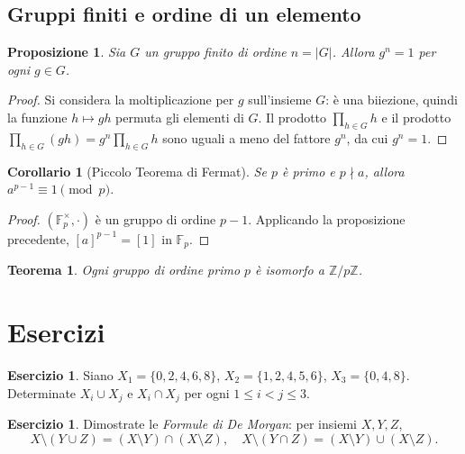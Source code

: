 \documentclass[11pt, a4paper]{book}
\theoremstyle{definition}
\newtheorem{esercizio}[definizione]{Esercizio}
\theoremstyle{plain}
\newtheorem{teorema}[definizione]{Teorema}
\newtheorem{proposizione}[definizione]{Proposizione}
\newtheorem{corollario}[definizione]{Corollario}
\theoremstyle{remark}
\newcommand{\Z}{\mathbb{Z}}
\begin{document}
\subsection{Gruppi finiti e ordine di un elemento}

\begin{proposizione}
Sia $G$ un gruppo finito di ordine $n = |G|$. Allora $g^n = 1$ per ogni $g \in G$.
\end{proposizione}

\begin{proof}
Si considera la moltiplicazione per $g$ sull'insieme $G$: è una biiezione, quindi la funzione $h \mapsto gh$ permuta gli elementi di $G$. Il prodotto $\prod_{h \in G} h$ e il prodotto $\prod_{h \in G} (gh) = g^n \prod_{h \in G} h$ sono uguali a meno del fattore $g^n$, da cui $g^n = 1$.
\end{proof}

\begin{corollario}[Piccolo Teorema di Fermat]
Se $p$ è primo e $p \nmid a$, allora $a^{p-1} \equiv 1 \pmod{p}$.
\end{corollario}

\begin{proof}
$(\mathbb{F}_p^\times, \cdot)$ è un gruppo di ordine $p - 1$. Applicando la proposizione precedente, $[a]^{p-1} = [1]$ in $\mathbb{F}_p$.
\end{proof}

\begin{teorema}
Ogni gruppo di ordine primo $p$ è isomorfo a $\Z/p\Z$.
\end{teorema}

\section*{Esercizi}

\begin{esercizio}
Siano $X_1 = \{0,2,4,6,8\}$, $X_2 = \{1,2,4,5,6\}$, $X_3 = \{0,4,8\}$. Determinate $X_i \cup X_j$ e $X_i \cap X_j$ per ogni $1 \leq i < j \leq 3$.
\end{esercizio}

\begin{esercizio}
Dimostrate le \emph{Formule di De Morgan}: per insiemi $X, Y, Z$,
\[
  X \setminus (Y \cup Z) = (X \setminus Y) \cap (X \setminus Z), \quad
  X \setminus (Y \cap Z) = (X \setminus Y) \cup (X \setminus Z).
\]
\end{esercizio}
\end{document}
